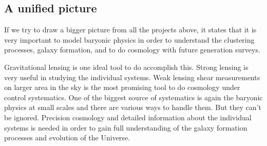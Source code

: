

\subsection{A unified picture}

If we try to draw a bigger picture from all the projects above, 
it states that it is very important to model baryonic physics 
in order to understand the clustering processes,
galaxy formation, and to do cosmology with future generation surveys. 

Gravitational lensing is one ideal tool to do accomplish this. Strong lensing
is very useful in studying the individual systems. 
Weak lensing shear measurements
on larger area in the sky is the most promising tool to do cosmology under
control systematics. One of the biggest source of systematics is again the 
baryonic physics at small scales and there are various ways to handle them. But
they can't be ignored. Precision cosmology and detailed information about the 
individual systems is needed in order to gain full understanding of the 
galaxy formation processes and evolution of the Universe. 




